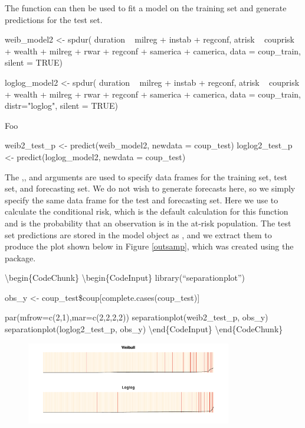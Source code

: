 \documentclass[article]{jss}
\begin{document}
\normalsize
The  function can then be used to fit a model on the
training set and generate predictions for the test set.

\begin{CodeChunk}
\begin{CodeInput}
weib_model2   <- spdur(
  duration ~ milreg + instab + regconf,
  atrisk ~ couprisk + wealth + milreg + rwar + regconf + samerica + camerica,
  data = coup_train, silent = TRUE)

loglog_model2 <- spdur(
  duration ~ milreg + instab + regconf,
  atrisk ~ couprisk + wealth + milreg + rwar + regconf + samerica + camerica,
  data = coup_train, distr="loglog", silent = TRUE) 
\end{CodeInput}
\end{CodeChunk}

Foo

\begin{CodeChunk}
\begin{CodeInput}
weib2_test_p   <- predict(weib_model2, newdata = coup_test)
loglog2_test_p <- predict(loglog_model2, newdata = coup_test)
\end{CodeInput}
\end{CodeChunk}

\normalsize
The ,, and  arguments are used to
specify data frames for the training set, test set, and forecasting set.
We do not wish to generate forecasts here, so we simply specify the same
data frame for the test and forecasting set. Here we use
 to calculate the conditional risk, which is the
default calculation for this function and is the probability that an
observation is in the at-risk population. The test set predictions are
stored in the model object as , and we extract them to
produce the plot shown below in Figure \ref{outsamp}, which was created
using the  package.

\textbackslash{}begin\{CodeChunk\} \textbackslash{}begin\{CodeInput\}
library(``separationplot'')

obs\_y \textless{}- coup\_test\$coup{[}complete.cases(coup\_test){]}

par(mfrow=c(2,1),mar=c(2,2,2,2)) separationplot(weib2\_test\_p, obs\_y)
separationplot(loglog2\_test\_p, obs\_y)
\textbackslash{}end\{CodeInput\} \textbackslash{}end\{CodeChunk\}

\begin{figure}
\begin{center}
\includegraphics[width=0.8\textwidth]{graphics/oos-sepplots.pdf}
\end{center}
\end{figure}
\end{document}
